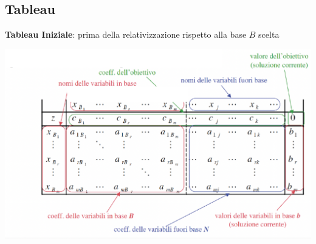 \documentclass[12pt,a4paper]{article}
\begin{document}
 \subsection{Tableau}
\textbf{Tableau Iniziale}: prima della relativizzazione rispetto alla base $B$ scelta
\begin{center}
\includegraphics[width=0.6\columnwidth]{img/tableau_iniziale.png}
\end{center} 
\end{document}
